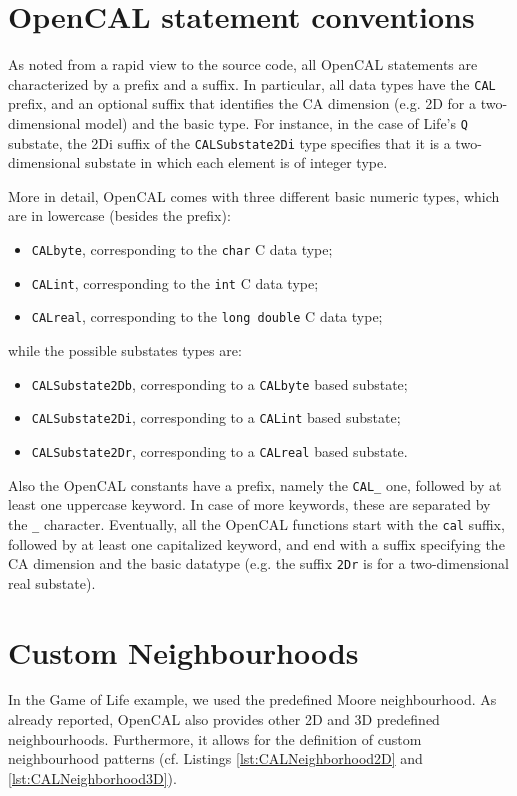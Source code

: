 \section{OpenCAL statement conventions}\label{sec:Conventions}
As noted from a rapid view to the source code, all  
OpenCAL statements are characterized by a prefix and a suffix. In particular, all 
data types have the \verb'CAL' prefix, and an optional suffix that
identifies the CA dimension (e.g. 2D for a two-dimensional model) and
the basic type. For instance, in the case of Life's \verb'Q'
substate, the 2Di suffix of the \verb'CALSubstate2Di' type specifies
that it is a two-dimensional substate in which each element is of
integer type.

More in detail, OpenCAL comes with three different basic numeric
types, which are in lowercase (besides the prefix):
\begin{itemize}
\item \verb'CALbyte', corresponding to the \verb'char' C data type;
\item \verb'CALint', corresponding to the \verb'int' C data type;
\item \verb'CALreal', corresponding to the \verb'long double' C data type;
\end{itemize}
while the possible substates types are:
\begin{itemize}
\item \verb'CALSubstate2Db', corresponding to a \verb'CALbyte' based substate;
\item \verb'CALSubstate2Di', corresponding to a \verb'CALint' based substate;
\item \verb'CALSubstate2Dr', corresponding to a \verb'CALreal' based substate.
\end{itemize}
Also the OpenCAL constants have a prefix, namely the \verb'CAL_' one,
followed by at least one uppercase keyword. In case of more keywords,
these are separated by the \verb'_' character. Eventually, all the
OpenCAL functions start with the \verb'cal' suffix, followed by at
least one capitalized keyword, and end with a suffix specifying the CA
dimension and the basic datatype (e.g. the suffix \verb'2Dr' is for a
two-dimensional real substate).

\section{Custom Neighbourhoods}\label{sec:CustomNeiughbourhoods}
In the Game of Life example, we used the predefined Moore
neighbourhood. As already reported, OpenCAL also provides other 2D and
3D predefined neighbourhoods. Furthermore, it allows for the
definition of custom neighbourhood patterns (cf. Listings
\ref{lst:CALNeighborhood2D} and \ref{lst:CALNeighborhood3D}).



